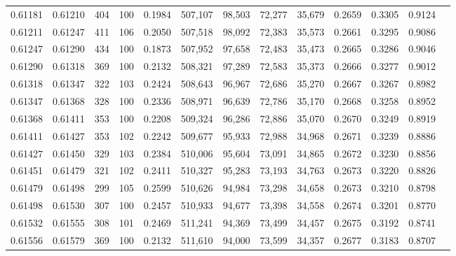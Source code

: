 \begin{tabular}{rrrrrrrrrrrrr}
0.61181 & 0.61210 &   404 & 100 &                                     0.1984 & 507,107 &  98,503 &  72,277 &  35,679 & 0.2659 & 0.3305 & 0.9124 \\
0.61211 & 0.61247 &   411 & 106 &                                     0.2050 & 507,518 &  98,092 &  72,383 &  35,573 & 0.2661 & 0.3295 & 0.9086 \\
0.61247 & 0.61290 &   434 & 100 &                                     0.1873 & 507,952 &  97,658 &  72,483 &  35,473 & 0.2665 & 0.3286 & 0.9046 \\
0.61290 & 0.61318 &   369 & 100 &                                     0.2132 & 508,321 &  97,289 &  72,583 &  35,373 & 0.2666 & 0.3277 & 0.9012 \\
0.61318 & 0.61347 &   322 & 103 &                                     0.2424 & 508,643 &  96,967 &  72,686 &  35,270 & 0.2667 & 0.3267 & 0.8982 \\
0.61347 & 0.61368 &   328 & 100 &                                     0.2336 & 508,971 &  96,639 &  72,786 &  35,170 & 0.2668 & 0.3258 & 0.8952 \\
0.61368 & 0.61411 &   353 & 100 &                                     0.2208 & 509,324 &  96,286 &  72,886 &  35,070 & 0.2670 & 0.3249 & 0.8919 \\
0.61411 & 0.61427 &   353 & 102 &                                     0.2242 & 509,677 &  95,933 &  72,988 &  34,968 & 0.2671 & 0.3239 & 0.8886 \\
0.61427 & 0.61450 &   329 & 103 &                                     0.2384 & 510,006 &  95,604 &  73,091 &  34,865 & 0.2672 & 0.3230 & 0.8856 \\
0.61451 & 0.61479 &   321 & 102 &                                     0.2411 & 510,327 &  95,283 &  73,193 &  34,763 & 0.2673 & 0.3220 & 0.8826 \\
0.61479 & 0.61498 &   299 & 105 &                                     0.2599 & 510,626 &  94,984 &  73,298 &  34,658 & 0.2673 & 0.3210 & 0.8798 \\
0.61498 & 0.61530 &   307 & 100 &                                     0.2457 & 510,933 &  94,677 &  73,398 &  34,558 & 0.2674 & 0.3201 & 0.8770 \\
0.61532 & 0.61555 &   308 & 101 &                                     0.2469 & 511,241 &  94,369 &  73,499 &  34,457 & 0.2675 & 0.3192 & 0.8741 \\
0.61556 & 0.61579 &   369 & 100 &                                     0.2132 & 511,610 &  94,000 &  73,599 &  34,357 & 0.2677 & 0.3183 & 0.8707 \\

\end{tabular}
